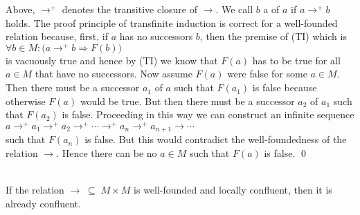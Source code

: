 \proof
Above, $\rightarrow^+$ denotes the transitive closure of $\rightarrow$.  We call $b$ a  of $a$
if $a \rightarrow^+ b$ holds.  The proof principle of transfinite induction is correct for a well-founded
relation because, first, if $a$ has no successors $b$, then the premise of (TI) which is
\\[0.2cm]
\hspace*{1.3cm}
$\forall b \in M: \bigl( a \rightarrow^+ b \Rightarrow F(b)\bigr)$
\\[0.2cm]
is vacuously true and hence by (TI) we know that $F(a)$ has to be true for all $a \in M$ that have no
successors.  Now assume $F(a)$ were false for some $a \in M$.  Then there must be a successor $a_1$ of $a$ such
that $F(a_1)$ is false because otherwise $F(a)$ would be true.  But then there must be a successor $a_2$ of
$a_1$ such that $F(a_2)$ is false.  Proceeding in this way we can construct an infinite sequence
\\[0.2cm]
\hspace*{1.3cm}
$a \rightarrow^+ a_1 \rightarrow^+ a_2 \rightarrow^+ \cdots \rightarrow^+ a_n \rightarrow^+ a_{n+1} \rightarrow
\cdots
$
\\[0.2cm]
such that $F(a_n)$ is false.  But this would contradict the well-foundedness of the relation $\rightarrow$.  Hence there can be no $a \in M$
such that $F(a)$ is false. \qed

\begin{Theorem} \hspace*{\fill} \\
  If the relation $\rightarrow \;\subseteq\; M \times M$ is well-founded and locally confluent, then it is
  already confluent.
\end{Theorem}

